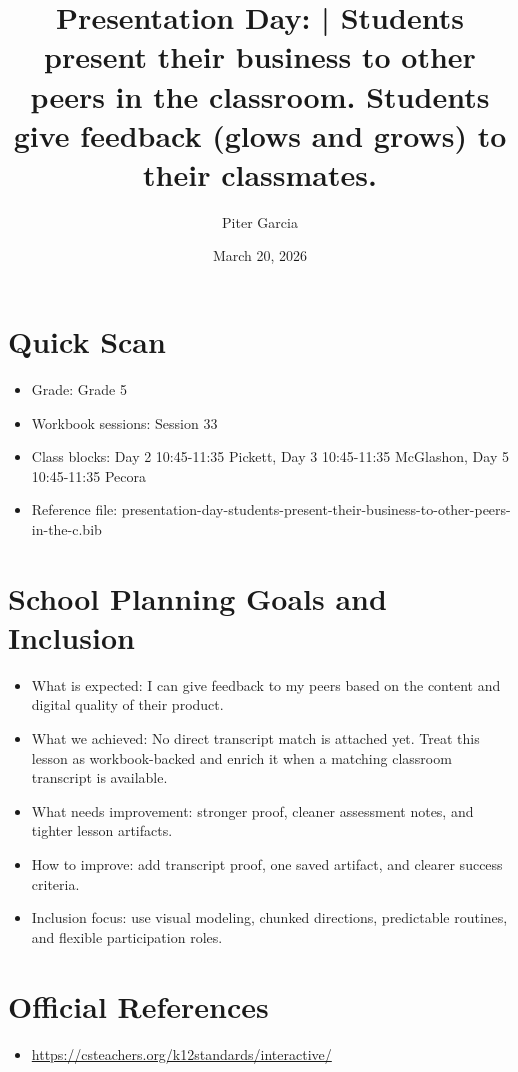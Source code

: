 \documentclass[11pt]{article}
\title{Presentation Day: | Students present their business to other peers in the classroom. Students give feedback (glows and grows) to their classmates.}
\author{Piter Garcia}
\date{March 20, 2026}
\begin{document}
\maketitle
\section*{Quick Scan}
\begin{itemize}[leftmargin=*]
\item Grade: Grade 5
\item Workbook sessions: Session 33
\item Class blocks: Day 2 10:45-11:35 Pickett, Day 3 10:45-11:35 McGlashon, Day 5 10:45-11:35 Pecora
\item Reference file: presentation-day-students-present-their-business-to-other-peers-in-the-c.bib
\end{itemize}
\section*{School Planning Goals and Inclusion}
\begin{itemize}[leftmargin=*]
\item What is expected: I can give feedback to my peers based on the content and digital quality of their product.
\item What we achieved: No direct transcript match is attached yet. Treat this lesson as workbook-backed and enrich it when a matching classroom transcript is available.
\item What needs improvement: stronger proof, cleaner assessment notes, and tighter lesson artifacts.
\item How to improve: add transcript proof, one saved artifact, and clearer success criteria.
\item Inclusion focus: use visual modeling, chunked directions, predictable routines, and flexible participation roles.
\end{itemize}
\section*{Official References}
\begin{itemize}[leftmargin=*]
\item \url{https://csteachers.org/k12standards/interactive/}

\end{itemize}
\end{document}
